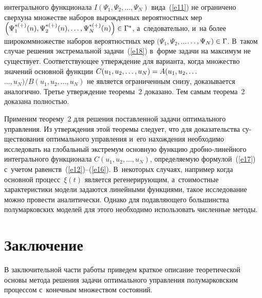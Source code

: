 \begin{multicols}{2}
интегрального функциона\-ла $I(\Psi_1, \Psi_2,\ldots, \Psi_N)$ вида~(\ref{e11}) 
не ограничено сверху\linebreak на множестве наборов вырожденных вероятностных мер 
$\left(\Psi_1^{*(+)}(n), \Psi_2^{*(+)}(n),\ldots, \Psi_N^{*(+)}(n)\right)\hm\in\Gamma^*$, 
а~следовательно, и~на более широком\linebreak множестве наборов вероятностных 
мер $(\Psi_1, \Psi_2,\ldots$\linebreak $\ldots, \Psi_N)\hm\in\Gamma$. В~таком случае решения экстремальной 
задачи~(\ref{e18}) в~форме задачи на максимум не существует. Соответствующее утвержде\-ние 
для варианта, когда множество значений основной функции $C(u_1, u_2,\ldots,u_N)
\hm=A(u_1, u_2,\ldots$\linebreak $\ldots,u_N)/{B(u_1, u_2,\ldots,u_N)}$ 
не является ограниченным снизу, доказывается аналогично. Третье утверж\-де\-ние теоремы~2 
доказано. Тем самым тео\-ре\-ма~2 доказана полностью.

\smallskip

Применим теорему~2 для решения поставленной задачи оптимального управления. 
Из утверждения этой теоремы следует, что для доказательства су-\linebreak ществования 
оптимального управ\-ле\-ния и~его нахождения необходимо исследовать на 
глобальный экстремум основную функцию дроб\-но-ли\-ней\-но\-го интегрального 
функционала $C(u_1,u_2,\ldots,u_N)$, определяемую формулой~(\ref{e17}) с~учетом 
равенств~(\ref{e12})--(\ref{e16}). В~некоторых случаях, например когда основной 
процесс~$\xi(t)$ является регенерирующим, а~стоимостные характеристики 
модели задаются линейными функциями, такое исследование можно провести 
аналитически. Однако для подавляющего большинства полумарковских моделей 
для этого необходимо использовать численные методы.

\section{Заключение}

В заключительной части работы приведем \mbox{краткое} описание теоретической 
основы метода решения задачи оптимального управления полумарковским 
процессом с~конечным множеством состояний.


\end{multicols}
